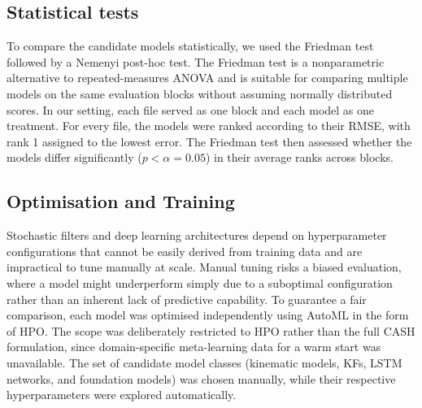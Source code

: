     \subsection{Statistical tests}
    \label{par:statistical}To compare the candidate models statistically, we used the Friedman test followed by a Nemenyi post-hoc test. The Friedman test is a nonparametric alternative to repeated-measures ANOVA and is suitable for comparing multiple models on the same evaluation blocks without assuming normally distributed scores. In our setting, each file served as one block and each model as one treatment. For every file, the models were ranked according to their \ac{RMSE}, with rank 1 assigned to the lowest error. The Friedman test then assessed whether the models differ significantly (\(p < \alpha = 0.05 \)) in their average ranks across blocks. 
    
    \subsection{Optimisation and Training}
    \label{subsec:automlhpo}
    Stochastic filters and deep learning architectures depend on hyperparameter configurations that cannot be easily derived from training data and are impractical to tune manually at scale.
    Manual tuning risks a biased evaluation, where a model might underperform simply due to a suboptimal configuration rather than an inherent lack of predictive capability.
    To guarantee a fair comparison, each model was optimised independently using \ac{AutoML} in the form of \acf{HPO}. The scope was deliberately restricted to \acs{HPO} rather than the full \ac{CASH} formulation, since domain-specific meta-learning data for a warm start was unavailable. The set of candidate model classes (kinematic models, \acp{KF}, \ac{LSTM} networks, and foundation models) was chosen manually, while their respective hyperparameters were explored automatically.
    
